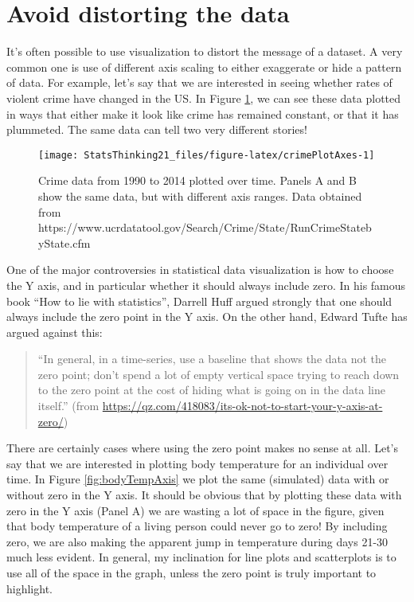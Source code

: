 \documentclass[]{book}
\theoremstyle{definition}
\theoremstyle{definition}
\theoremstyle{definition}
\theoremstyle{remark}
\begin{document}
\section{Avoid distorting the data}\label{avoid-distorting-the-data}

It's often possible to use visualization to distort the message of a
dataset. A very common one is use of different axis scaling to either
exaggerate or hide a pattern of data. For example, let's say that we are
interested in seeing whether rates of violent crime have changed in the
US. In Figure \ref{fig:crimePlotAxes}, we can see these data plotted in
ways that either make it look like crime has remained constant, or that
it has plummeted. The same data can tell two very different stories!

\begin{figure}
\texttt{[image: StatsThinking21\_files/figure-latex/crimePlotAxes-1]} \caption{Crime data from 1990 to 2014 plotted over time.  Panels A and B show the same data, but with different axis ranges. Data obtained from https://www.ucrdatatool.gov/Search/Crime/State/RunCrimeStatebyState.cfm}\label{fig:crimePlotAxes}
\end{figure}

One of the major controversies in statistical data visualization is how
to choose the Y axis, and in particular whether it should always include
zero. In his famous book ``How to lie with statistics'', Darrell Huff
argued strongly that one should always include the zero point in the Y
axis. On the other hand, Edward Tufte has argued against this:

\begin{quote}
``In general, in a time-series, use a baseline that shows the data not
the zero point; don't spend a lot of empty vertical space trying to
reach down to the zero point at the cost of hiding what is going on in
the data line itself.'' (from
\url{https://qz.com/418083/its-ok-not-to-start-your-y-axis-at-zero/})
\end{quote}

There are certainly cases where using the zero point makes no sense at
all. Let's say that we are interested in plotting body temperature for
an individual over time. In Figure \ref{fig:bodyTempAxis} we plot the
same (simulated) data with or without zero in the Y axis. It should be
obvious that by plotting these data with zero in the Y axis (Panel A) we
are wasting a lot of space in the figure, given that body temperature of
a living person could never go to zero! By including zero, we are also
making the apparent jump in temperature during days 21-30 much less
evident. In general, my inclination for line plots and scatterplots is
to use all of the space in the graph, unless the zero point is truly
important to highlight.
\end{document}
